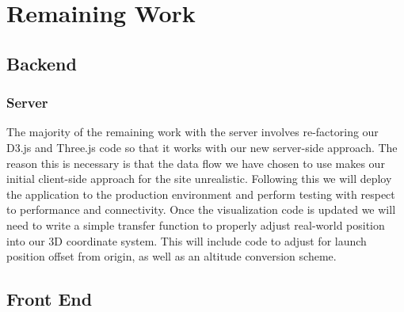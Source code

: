 \documentclass[journal,10pt,onecolumn,compsoc]{IEEEtran}
\begin{document}

\section{Remaining Work}

	\subsection{Backend}
		
		\subsubsection{}
			
		\subsubsection{}
		
		\subsubsection{Server}
      The majority of the remaining work with the server involves re-factoring our D3.js and Three.js code so that it works with our new server-side approach.
      The reason this is necessary is that the data flow we have chosen to use makes our initial client-side approach for the site unrealistic.
			Following this we will deploy the application to the production environment and perform testing with respect to performance and connectivity.
			Once the visualization code is updated we will need to write a simple transfer function to properly adjust real-world position into our 3D coordinate system.
      This will include code to adjust for launch position offset from origin, as well as an altitude conversion scheme.
	
	\subsection{Front End}
	
\end{document}
